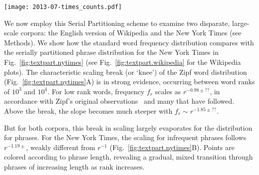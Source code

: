 \begin{figure*}[tbp!]
  \centering
  \texttt{[image: 2013-07-times\_counts.pdf]}
  \caption{
    \textbf{A.} The distribution of words from the New York Times corpus.
    \textbf{B.} Serially partitioned phrases from the New York Times corpus. 
    An ideal Zipf distribution will appear as a straight line of slope $-1$ (red dotted line for reference). 
    The inset bar plot shows the percent of all unique symbols
    partitioned at each phrase length (pink), 
    and the percent of the total number of units partitioned at each
    order (grey)
    The phrases presented are ranks $10^n$ ($n=0,...,6$) in both the word and phrase separated distributions. 
    Even at high ranks, phrase units are interpretable (often idiomatic) regular language components, 
    while high ranking words like `cabbage', `mysteriousness' and
    `fish-slicing' are difficult to glean meaning from outside of
    context.\newline
    \newline
    \newline
    \newline
    \newline
    }
  \label{fig:textpart.nytimes}
\end{figure*}


We now employ this Serial Partitioning scheme to examine
two disparate, large-scale corpora: 
the English version of Wikipedia and the New York Times (see Methods).
We show how the standard word frequency distribution compares with
the serially partitioned  phrase distribution for the New York Times in
Fig.~\ref{fig:textpart.nytimes}
(see Fig.~\ref{fig:textpart.wikipedia} for the Wikipedia plots).
The characteristic scaling break (or `knee') of the Zipf  word distribution
(Fig.~\ref{fig:textpart.nytimes}A)
is in strong evidence, occurring between word ranks of $10^3$ and $10^4$.
For low rank words, frequency $f_r$ scales as $r^{-0.98 \pm ??}$, in
accordance with Zipf's original observations~\cite{zipf1949a} and many that have followed.
Above the break, the slope becomes much steeper with 
$f_r \sim r^{-1.85 \pm ??}$.

But for both corpora, this break in scaling largely evaporates
for the distribution for phrases.
For the New York Times, the scaling for infrequent phrases 
follows  $r^{-1.19 \pm}$, weakly different from $r^{-1}$ (Fig.~\ref{fig:textpart.nytimes}B).
Points are colored according to phrase length, revealing a gradual,
mixed transition through phrases of increasing length as rank increases.


